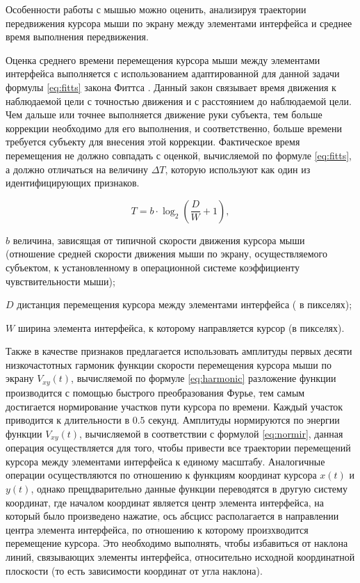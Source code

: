Особенности работы с мышью можно оценить, анализируя траектории передвижения курсора мыши по экрану между элементами интерфейса и среднее время выполнения передвижения. \cite{recognitionOfPsycho}

Оценка среднего времени перемещения курсора мыши между элементами интерфейса выполняется с использованием адаптированной для данной задачи формулы \ref{eq:fitts} закона Фиттса \cite{fitts}. Данный закон связывает время движения к наблюдаемой цели с точностью движения и с расстоянием до наблюдаемой цели. Чем дальше или точнее выполняется движение руки субъекта, тем больше коррекции необходимо для его выполнения, и соответственно, больше времени требуется субъекту для внесения этой коррекции. Фактическое время перемещения не должно совпадать с оценкой, вычисляемой по формуле \ref{eq:fitts}, а должно отличаться на величину $\Delta T$, которую используют как один из идентифицирующих признаков. \cite{mouseMethod}

\begin{equation}
\label{eq:fitts}
T = b \cdot \log_{2}\left(\frac{D}{W} + 1\right),
\end{equation}

\begin{eqexpl}[15mm]
\item{$b$} величина, зависящая от типичной скорости движения курсора мыши (отношение средней скорости движения мыши по экрану, осуществляемого субъектом, к установленному в операционной системе коэффициенту чувствительности мыши);
\item{$D$} дистанция перемещения курсора между элементами интерфейса ( в пикселях);
\item{$W$} ширина элемента интерфейса, к которому направляется курсор (в пикселях).
\end{eqexpl}

Также в качестве признаков предлагается использовать амплитуды первых десяти низкочастотных гармоник функции скорости перемещения курсора мыши по экрану $V_{xy}(t)$, вычисляемой по формуле \ref{eq:harmonic} разложение функции производится с помощью быстрого преобразования Фурье, тем самым достигается нормирование участков пути курсора по времени. Каждый участок приводится к длительности в $0.5$ секунд. Амплитуды нормируются по энергии функции $V_{xy}(t)$, вычисляемой в соответствии с формулой \ref{eq:normir}, данная операция осуществляется для того, чтобы привести все траектории перемещений курсора между элементами интерфейса к единому масштабу. Аналогичные операции осуществляются по отношению к функциям координат курсора $x(t)$ и $y(t)$, однако прещдварительно данные функции переводятся в другую систему координат, где началом координат является центр элемента интерфейса, на который было произведено нажатие, ось абсцисс располагается в направлении центра элемента интерфейса, по отношению к которому произхводится перемещение курсора. Это необходимо выполнять, чтобы избавиться от наклона линий, связывающих элементы интерфейса, относительно исходной координатной плоскости (то есть зависимости координат от угла наклона). \cite{mouseMethod}

